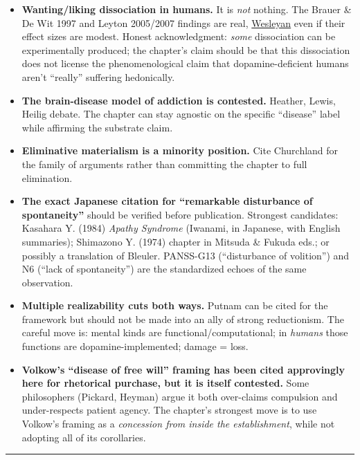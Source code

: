 \begin{itemize}
\tightlist
\item
  \textbf{Wanting/liking dissociation in humans.} It is \emph{not} nothing. The Brauer \& De Wit 1997 and Leyton 2005/2007 findings are real, \href{https://robinsonlab.research.wesleyan.edu/files/2014/01/Robinson-2015-Curr-Top-Behav-Neurosci.pdf}{Wesleyan} even if their effect sizes are modest. Honest acknowledgment: \emph{some} dissociation can be experimentally produced; the chapter's claim should be that this dissociation does not license the phenomenological claim that dopamine-deficient humans aren't ``really'' suffering hedonically.
\item
  \textbf{The brain-disease model of addiction is contested.} Heather, Lewis, Heilig debate. The chapter can stay agnostic on the specific ``disease'' label while affirming the substrate claim.
\item
  \textbf{Eliminative materialism is a minority position.} Cite Churchland for the family of arguments rather than committing the chapter to full elimination.
\item
  \textbf{The exact Japanese citation for ``remarkable disturbance of spontaneity''} should be verified before publication. Strongest candidates: Kasahara Y. (1984) \emph{Apathy Syndrome} (Iwanami, in Japanese, with English summaries); Shimazono Y. (1974) chapter in Mitsuda \& Fukuda eds.; or possibly a translation of Bleuler. PANSS-G13 (``disturbance of volition'') and N6 (``lack of spontaneity'') are the standardized echoes of the same observation.
\item
  \textbf{Multiple realizability cuts both ways.} Putnam can be cited for the framework but should not be made into an ally of strong reductionism. The careful move is: mental kinds are functional/computational; in \emph{humans} those functions are dopamine-implemented; damage = loss.
\item
  \textbf{Volkow's ``disease of free will'' framing has been cited approvingly here for rhetorical purchase, but it is itself contested.} Some philosophers (Pickard, Heyman) argue it both over-claims compulsion and under-respects patient agency. The chapter's strongest move is to use Volkow's framing as a \emph{concession from inside the establishment}, while not adopting all of its corollaries.
\end{itemize}

\begin{center}\rule{0.5\linewidth}{0.5pt}\end{center}

